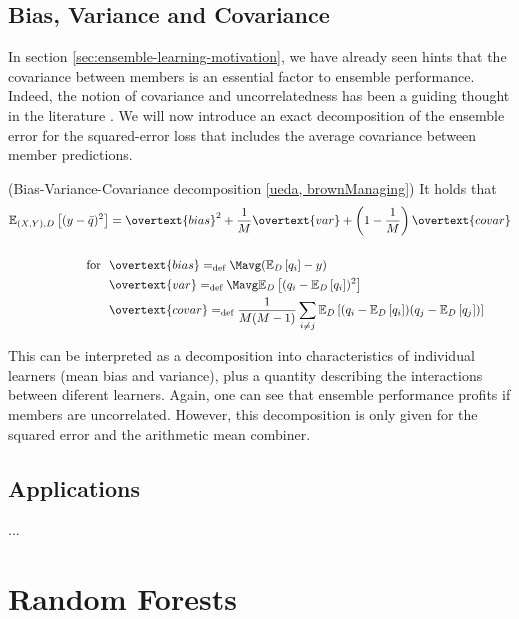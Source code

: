 \documentclass[
    a4paper, %
	fontsize=10pt, %
	twoside=false, %
]{kaobook}
\begin{document}
\section{Bias, Variance and Covariance}
\label{sec:bias-variance-covariance}

In section \ref{sec:ensemble-learning-motivation}, we have already seen hints that the covariance between members is an essential factor to ensemble performance. Indeed, the notion of covariance and uncorrelatedness has been a guiding thought in the literature \cite{didaci_DiversityClassifierEnsembles_2013, brown_ManagingDiversityRegression_2005, buschjager_GeneralizedNegativeCorrelation_2020}.
We will now introduce an exact decomposition of the ensemble error for the squared-error loss that includes the average covariance between member predictions.
\begin{theorem} (Bias-Variance-Covariance decomposition \ref{ueda, brownManaging})
It holds that
$$
\begin{align}
\mathbb{E}_{(X,Y),D}\left[ (y - \bar{q})^2 \right]  &= \overtext{bias}^2 + \frac{1}{M} \overtext{var} + \left( 1 - \frac{1}{M} \right) \overtext{covar} \\ \\ 
\text{for} ~ ~ & \overtext{bias} =_{\text{def}} \Mavg (\mathbb{E}_{D}\left[ q_{i}  \right] - y) \\
& \overtext{var} =_{\text{def}} \Mavg \mathbb{E}_{D}\left[ (q_{i} - \mathbb{E}_{D}\left[ q_{i} \right])^2  \right]  \\
& \overtext{covar} =_{\text{def}} \frac{1}{M(M-1)} \sum_{i \not= j} \mathbb{E}_{D}\left[ (q_{i} - \mathbb{E}_{D}\left[ q_{i} \right] ) (q_{j} - \mathbb{E}_{D}\left[ q_{j} \right] ) \right] 
\end{align}
$$
\end{theorem}
This can be interpreted as a decomposition into characteristics of individual learners (mean bias and variance), plus a quantity describing the interactions between diferent learners. Again, one can see that ensemble performance profits if members are uncorrelated.
However, this decomposition is only given for the squared error and the arithmetic mean combiner. 

\section{Applications}
...

\chapter{Random Forests}

\end{document}
